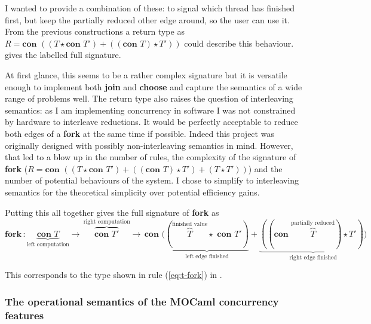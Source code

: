 \documentclass[12pt,twoside,notitlepage]{report}
\theoremstyle{plain}%
\theoremstyle{definition}
\theoremstyle{remark}
\begin{document}
I wanted to provide a combination of these: to signal which thread has finished first, but keep the partially reduced other edge around, so the user can use it. From the previous constructions a return type as $ R = \textbf{con }((T\star \textbf{con } T') + ((\textbf{con } T) \star T')) $ could describe this behaviour.  gives the labelled full signature.

 At first glance, this seems to be a rather complex signature but  it is versatile enough to implement both \textbf{join} and \textbf{choose} and capture the semantics of a wide range of problems well. The return type also raises the question of interleaving semantics: as I am implementing concurrency in software I was not constrained by hardware to interleave reductions. It would be perfectly acceptable to reduce both edges of a \textbf{fork} at the same time if possible. Indeed this project was originally designed with possibly non-interleaving semantics in mind. However, that led to a blow up in the number of rules, the complexity of the signature of \textbf{fork} ($ R = \textbf{con }((T\star \textbf{con } T') + ((\textbf{con } T) \star T') + (T \star T'))   $) and the number of potential behaviours of the system. I chose to simplify to interleaving semantics for the theoretical simplicity over potential efficiency gains.

Putting this all together gives the full signature of \textbf{fork} as 
\begin{equation}
\textbf{fork} \, : \!\!\!\!\! \underbrace{\textbf{con } T}_{\text{left computation}}\!\!\!\!\!\! \rightarrow \, \!\!\!\!\!\!\overbrace{\textbf{con } T'}^{\text{right computation}}\!\!\!\!\!\!\!\! \rightarrow\, \textbf{con }(\underbrace{(\!\!\!\!\!\!\overbrace{T}^{\text{finished value}}\!\!\!\!\!\!\star\,\, \textbf{con } T')}_{\text{left edge finished}} + \underbrace{((\textbf{con } \!\!\!\!\!\!\!\!\!\!\!\!\overbrace{T}^{\text{partially reduced}}\!\!\!\!\!\!\!\!\!\!) \star T'))}_{\text{right edge finished}} \tag{Fork-Full-Signature}\label{eq:fork_full_sig} \end{equation}


This corresponds to the type shown in rule (\ref{eq:t-fork}) in .

\subsubsection{The operational semantics of the MOCaml concurrency features}
\end{document}
